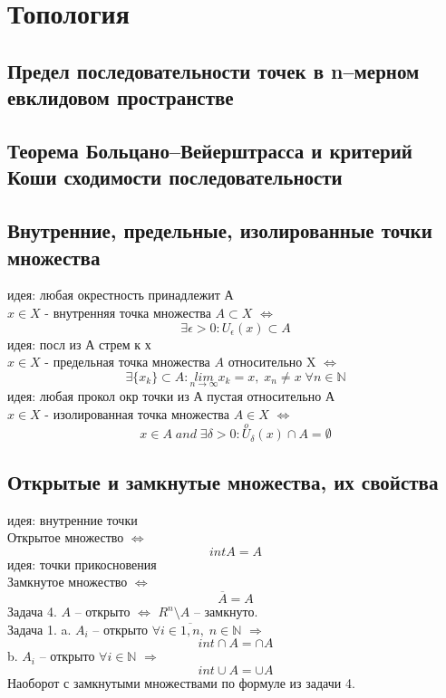 \documentclass{article}
\begin{document}
\section{Топология}
\subsection{Предел последовательности точек в n–мерном евклидовом пространстве}

\subsection{Теорема Больцано–Вейерштрасса и критерий Коши сходимости последовательности}
\subsection{Внутренние, предельные, изолированные точки множества}
идея: любая окрестность принадлежит А \\
$x \in X$ - внутренняя точка множества $A \subset X$ $\Leftrightarrow$
\begin{equation*}
    \exists \epsilon > 0: U_\epsilon (x) \subset A
\end{equation*}
идея: посл из А стрем к х \\
$x \in X$ - предельная точка множества $A$ относительно X $\Leftrightarrow$
\begin{equation*}
    \exists \{ x_k \} \subset A: \underset{n \rightarrow \infty}{lim} x_k = x, \; x_n \neq x \; \forall n \in \mathbb N
\end{equation*}
идея: любая прокол окр точки из А пустая относительно А \\
$x \in X$ - изолированная точка множества $A  \in X$ $\Leftrightarrow$
\begin{equation*}
    x \in A \; and \; \exists \delta > 0 : \overset{o}{U}_\delta (x) \cap A = \emptyset
\end{equation*}
\subsection{Открытые и замкнутые множества, их свойства}
идея: внутренние точки \\
Открытое множество  $\Leftrightarrow$
\begin{equation*}
    int A = A
\end{equation*}
идея: точки прикосновения \\
Замкнутое множество $\Leftrightarrow$
\begin{equation*}
    \overline A = A
\end{equation*}
Задача 4. $A$ -- открыто  $\Leftrightarrow$ $R^n \setminus A$ -- замкнуто. \\
Задача 1. a. $A_i$ -- открыто $\forall i \in \overline{1, n}, \; n \in \mathbb N $ $\Rightarrow$
\begin{equation*}
    int \cap A = \cap A
\end{equation*}
b. $A_i$ -- открыто $\forall i \in \mathbb N $ $\Rightarrow$
\begin{equation*}
    int \cup A = \cup A
\end{equation*}
Наоборот с замкнутыми множествами по формуле из задачи 4.
\end{document}
